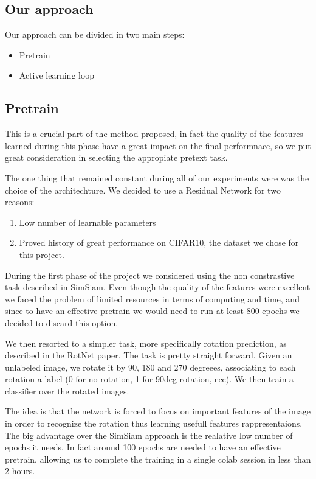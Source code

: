 \documentclass{article}
\begin{document}
\begin{flushleft}
\subsection*{Our approach}
Our approach can be divided in two main steps:
\begin{itemize}
    \item Pretrain
    \item Active learning loop
\end{itemize}

\subsection*{Pretrain}
This is a crucial part of the method proposed, in fact the quality of the features learned 
during this phase have a great impact on the final performnace, 
so we put great consideration in selecting the appropiate pretext task.

The one thing that remained constant during all of our experiments 
were was the choice of the architechture. 
We decided to use a Residual Network for two reasons:
\begin{enumerate}
    \item Low number of learnable parameters
    \item Proved history of great performance on CIFAR10, the dataset we chose for this project.
\end{enumerate}
During the first phase of the project we considered using the non constrastive task 
described in SimSiam. Even though the quality of the features were excellent 
we faced the problem of limited resources in terms of computing and time, 
and since to have an effective pretrain we would need to run at least 800 epochs 
we decided to discard this option.
\end{flushleft}
\begin{flushleft}
We then resorted to a simpler task, more specifically rotation prediction, 
as described in the RotNet paper. The task is pretty straight forward. 
Given an unlabeled image, we rotate it by 90, 180 and 270 degreees, 
associating to each rotation a label (0 for no rotation, 1 for 90deg rotation, ecc). 
We then train a classifier over the rotated images. 
\end{flushleft}
\begin{flushleft}
The idea is that the network is forced to focus on important features 
of the image in order to recognize the rotation thus learning usefull features 
rappresentaions. The big advantage over the SimSiam approach is the realative low number of epochs it needs. 
In fact around 100 epochs are needed to have an effective pretrain, allowing us to complete the training in a 
single colab session in less than 2 hours.
\end{flushleft}
\end{document}
